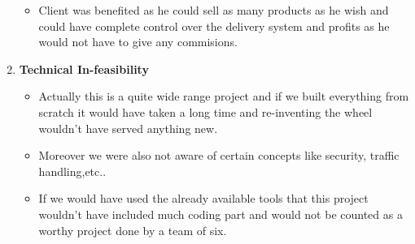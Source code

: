 \documentclass[fleqn,10pt]{../SelfArx} %
\begin{document}
\begin{enumerate}
\begin{itemize}
 \item Client was benefited as he could sell as many products as he wish and could have complete control over the delivery system and profits as he would not have to give any commisions.
\end{itemize}

\item \textbf{Technical In-feasibility}
\begin{itemize}
 \item Actually this is a quite wide range project and if we built everything from scratch it would have taken a long time and re-inventing the wheel wouldn't have served anything new.
 \item Moreover we were also not aware of certain concepts like security,  traffic handling,etc..
 \item If we would have used the already available tools that this project wouldn't have included much coding part and would not be counted as a worthy project done by a team of six.
\end{itemize}

\end{enumerate}
\end{document}
